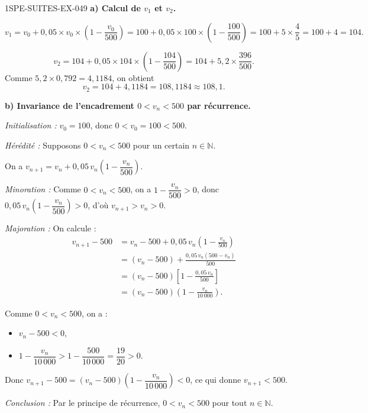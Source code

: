 \begin{corrige}{1SPE-SUITES-EX-049}
\textbf{a) Calcul de $v_1$ et $v_2$.}

\[
v_1 = v_0 + 0{,}05 \times v_0 \times \left(1 - \frac{v_0}{500}\right) = 100 + 0{,}05 \times 100 \times \left(1 - \frac{100}{500}\right) = 100 + 5 \times \frac{4}{5} = 100 + 4 = 104.
\]

\[
v_2 = 104 + 0{,}05 \times 104 \times \left(1 - \frac{104}{500}\right) = 104 + 5{,}2 \times \frac{396}{500}.
\]
Comme $5{,}2 \times 0{,}792 = 4{,}1184$, on obtient
\[
v_2 = 104 + 4{,}1184 = 108{,}1184 \approx 108{,}1.
\]

\textbf{b) Invariance de l'encadrement $0 < v_n < 500$ par récurrence.}


\textit{Initialisation :} $v_0 = 100$, donc $0 < v_0 = 100 < 500$. \checkmark

\textit{Hérédité :} Supposons $0 < v_n < 500$ pour un certain $n \in \mathbb{N}$.

On a $v_{n+1} = v_n + 0{,}05\,v_n\!\left(1 - \dfrac{v_n}{500}\right)$.

\textit{Minoration :} Comme $0 < v_n < 500$, on a $1 - \dfrac{v_n}{500} > 0$, donc $0{,}05\,v_n\!\left(1 - \dfrac{v_n}{500}\right) > 0$, d'où $v_{n+1} > v_n > 0$.

\textit{Majoration :} On calcule :
\begin{align*}
v_{n+1} - 500 &= v_n - 500 + 0{,}05\,v_n\left(1 - \frac{v_n}{500}\right) \\
&= (v_n - 500) + \frac{0{,}05\,v_n(500 - v_n)}{500} \\
&= (v_n - 500)\left[1 - \frac{0{,}05\,v_n}{500}\right] \\
&= (v_n - 500)\left(1 - \frac{v_n}{10\,000}\right).
\end{align*}

Comme $0 < v_n < 500$, on a :
\begin{itemize}
  \item $v_n - 500 < 0$,
  \item $1 - \dfrac{v_n}{10\,000} > 1 - \dfrac{500}{10\,000} = \dfrac{19}{20} > 0$.
\end{itemize}

Donc $v_{n+1} - 500 = (v_n - 500)\!\left(1 - \dfrac{v_n}{10\,000}\right) < 0$, ce qui donne $v_{n+1} < 500$. \checkmark

\textit{Conclusion :} Par le principe de récurrence, $0 < v_n < 500$ pour tout $n \in \mathbb{N}$.


\end{corrige}
